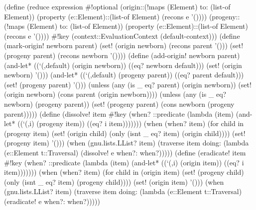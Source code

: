 \documentclass[acmsmall]{acmart}
\newenvironment{Snippet}{\Verbatim[samepage=true]}{\endVerbatim}
\begin{document}
\begin{Snippet}
(define (reduce expression 
                #!optional 
                (origin::(!maps (Element) to: (list-of Element))
			 (property (e::Element)::(list-of Element)
				   (recons e '())))
		(progeny::(!maps (Element) to: (list-of Element))
			  (property (e::Element)::(list-of Element)
				    (recons e '())))
		#!key
		(context::EvaluationContext (default-context)))
\end{Snippet}
\begin{Snippet}
  (define (mark-origin! newborn parent)
    (set! (origin newborn) (recons parent '()))
    (set! (progeny parent) (recons newborn '())))
\end{Snippet}
\begin{Snippet}
  (define (add-origin! newborn parent)
    (and-let* ((`(,default) (origin newborn))
	       ((eq? newborn default)))
      (set! (origin newborn) '()))
    (and-let* ((`(,default) (progeny parent))
	       ((eq? parent default)))
      (set! (progeny parent) '()))
    (unless (any (is _ eq? parent) (origin newborn))
      (set! (origin newborn) (cons parent (origin newborn))))
    (unless (any (is _ eq? newborn) (progeny parent))
      (set! (progeny parent) (cons newborn (progeny parent)))))
\end{Snippet}
\begin{Snippet}
  (define (dissolve! item #!key (when? ::predicate
		                       (lambda (item)
		                         (and-let* ((`(,i) (progeny item))
			                            ((eq? i item)))))))
    (when (when? item)
      (for child in (progeny item)
	(set! (origin child) (only (isnt _ eq? item) (origin child))))
      (set! (progeny item) '()))
\end{Snippet}
\begin{Snippet}
    (when (gnu.lists.LList? item)
      (traverse item doing: (lambda (e::Element t::Traversal)
	                      (dissolve! e when?: when?)))))
\end{Snippet}
\begin{Snippet}
  (define (eradicate! item #!key (when? ::predicate
					(lambda (item)
					  (and-let* ((`(,i) (origin item))
						     ((eq? i item)))))))
    (when (when? item)
      (for child in (origin item)
	(set! (progeny child) (only (isnt _ eq? item) (progeny child))))     
      (set! (origin item) '()))
\end{Snippet}
\begin{Snippet}
    (when (gnu.lists.LList? item)
      (traverse item doing: (lambda (e::Element t::Traversal)
                              (eradicate! e when?: when?)))))
\end{Snippet}
\end{document}
